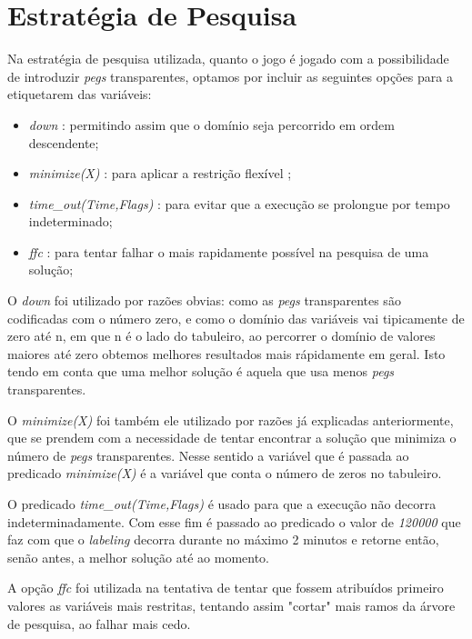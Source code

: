\documentclass{llncs}
\begin{document}
\section{Estrat\'{e}gia de Pesquisa}

Na estrat\'{e}gia de pesquisa utilizada, quanto o jogo \'{e} jogado com a possibilidade de introduzir \emph{pegs} transparentes, optamos por incluir as seguintes op\c{c}\~{o}es para a etiquetarem das vari\'{a}veis:

\begin{itemize}
\item \emph{down} : permitindo assim que o dom\'{i}nio seja percorrido em ordem descendente;
\item \emph{minimize(X)} : para aplicar a restri\c{c}\~{a}o flex\'{i}vel ;
\item \emph{time\_out(Time,Flags)} : para evitar que a execu\c{c}\~{a}o se prolongue por tempo indeterminado;
\item \emph{ffc} : para tentar falhar o mais rapidamente poss\'{i}vel na pesquisa de uma solu\c{c}\~{a}o;
\end{itemize}

O \emph{down} foi utilizado por raz\~{o}es obvias: como as \emph{pegs} transparentes s\~{a}o codificadas com o n\'{u}mero zero, e como o dom\'{i}nio das vari\'{a}veis vai tipicamente de zero at\'{e} n, em que n \'{e} o lado do tabuleiro, ao percorrer o dom\'{i}nio de valores maiores at\'{e} zero obtemos melhores resultados mais r\'{a}pidamente em geral. Isto tendo em conta que uma melhor solu\c{c}\~{a}o \'{e} aquela que usa menos \emph{pegs} transparentes.

O \emph{minimize(X)} foi tamb\'{e}m ele utilizado por raz\~{o}es j\'{a} explicadas anteriormente, que se prendem com a necessidade de tentar encontrar a solu\c{c}\~{a}o que minimiza o n\'{u}mero de \emph{pegs} transparentes. Nesse sentido a vari\'{a}vel que \'{e} passada ao predicado \emph{minimize(X)} \'{e} a vari\'{a}vel que conta o n\'{u}mero de zeros no tabuleiro. 

O predicado \emph{time\_out(Time,Flags)} \'{e} usado para que a execu\c{c}\~{a}o n\~{a}o decorra indeterminadamente. Com esse fim \'{e} passado ao predicado o valor de \emph{120000} que faz com que o \emph{labeling} decorra  durante no m\'{a}ximo 2 minutos e retorne ent\~{a}o, sen\~{a}o antes, a melhor solu\c{c}\~{a}o at\'{e} ao momento.

A op\c{c}\~{a}o \emph{ffc} foi utilizada na tentativa de tentar que fossem atribu\'{i}dos primeiro valores as vari\'{a}veis mais restritas, tentando assim "cortar" mais ramos da \'{a}rvore de pesquisa, ao falhar mais cedo.
\end{document}
